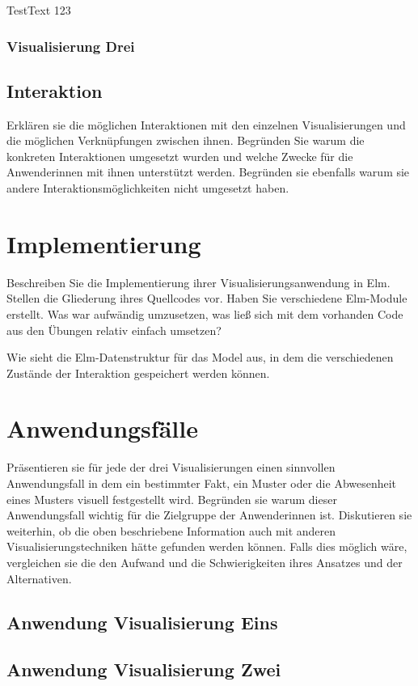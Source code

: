 \documentclass[usegeometry=true]{scrartcl}
\begin{document}
TestText 123
\subsubsection{Visualisierung Drei}

\subsection{Interaktion}

Erklären sie die möglichen Interaktionen mit den einzelnen Visualisierungen und die möglichen Verknüpfungen zwischen ihnen. Begründen Sie warum die konkreten Interaktionen umgesetzt wurden und welche Zwecke für die Anwenderinnen mit ihnen unterstützt werden. Begründen sie ebenfalls warum sie andere Interaktionsmöglichkeiten nicht umgesetzt haben. 

\section{Implementierung}
Beschreiben Sie die Implementierung ihrer Visualisierungsanwendung in Elm. Stellen die Gliederung ihres Quellcodes vor. Haben Sie verschiedene Elm-Module erstellt. Was war aufwändig umzusetzen, was ließ sich mit dem vorhanden Code aus den Übungen relativ einfach umsetzen? 


Wie sieht die Elm-Datenstruktur für das Model aus, in dem die verschiedenen Zustände der Interaktion gespeichert werden können.

\section{Anwendungsfälle}
Präsentieren sie für jede der drei Visualisierungen einen sinnvollen Anwendungsfall in dem ein bestimmter Fakt, ein Muster oder die Abwesenheit eines Musters visuell festgestellt wird. Begründen sie warum dieser Anwendungsfall wichtig für die Zielgruppe der Anwenderinnen ist. Diskutieren sie weiterhin, ob die oben beschriebene Information auch mit anderen Visualisierungstechniken hätte gefunden werden können. Falls dies möglich wäre, vergleichen sie die den Aufwand und die Schwierigkeiten ihres Ansatzes und der Alternativen. 
\subsection{Anwendung Visualisierung Eins}
\subsection{Anwendung Visualisierung Zwei}
\end{document}
